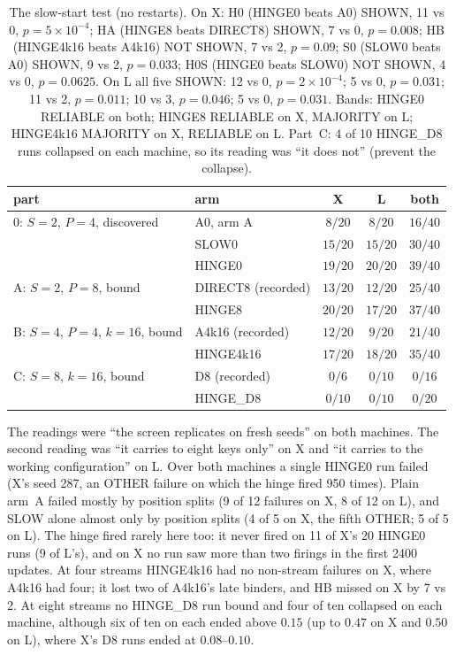 \documentclass[11pt]{article}
\newcommand{\arm}[1]{\textsf{#1}}
\begin{document}
\begin{table}[h]
\centering
\small
\begin{tabular}{@{}llccc@{}}
\toprule
part & arm & X & L & both\\
\midrule
0: $S{=}2$, $P{=}4$, discovered & \arm{A0}, arm \arm{A} & $8/20$ & $8/20$ & $16/40$\\
 & \arm{SLOW0} & $15/20$ & $15/20$ & $30/40$\\
 & \arm{HINGE0} & $19/20$ & $20/20$ & $39/40$\\
\midrule
A: $S{=}2$, $P{=}8$, bound & \arm{DIRECT8} (recorded) & $13/20$ & $12/20$ & $25/40$\\
 & \arm{HINGE8} & $20/20$ & $17/20$ & $37/40$\\
\midrule
B: $S{=}4$, $P{=}4$, $k{=}16$, bound & \arm{A4k16} (recorded) & $12/20$ & $9/20$ & $21/40$\\
 & \arm{HINGE4k16} & $17/20$ & $18/20$ & $35/40$\\
\midrule
C: $S{=}8$, $k{=}16$, bound & \arm{D8} (recorded) & $0/6$ & $0/10$ & $0/16$\\
 & \arm{HINGE\_D8} & $0/10$ & $0/10$ & $0/20$\\
\bottomrule
\end{tabular}
\caption{The slow-start test (no restarts). On X: H0 (\arm{HINGE0} beats \arm{A0}) SHOWN, 11 vs 0, $p = 5\times10^{-4}$; HA (\arm{HINGE8} beats \arm{DIRECT8}) SHOWN, 7 vs 0, $p = 0.008$; HB (\arm{HINGE4k16} beats \arm{A4k16}) NOT SHOWN, 7 vs 2, $p = 0.09$; S0 (\arm{SLOW0} beats \arm{A0}) SHOWN, 9 vs 2, $p = 0.033$; H0S (\arm{HINGE0} beats \arm{SLOW0}) NOT SHOWN, 4 vs 0, $p = 0.0625$. On L all five SHOWN: 12 vs 0, $p = 2\times10^{-4}$; 5 vs 0, $p = 0.031$; 11 vs 2, $p = 0.011$; 10 vs 3, $p = 0.046$; 5 vs 0, $p = 0.031$. Bands: \arm{HINGE0} RELIABLE on both; \arm{HINGE8} RELIABLE on X, MAJORITY on L; \arm{HINGE4k16} MAJORITY on X, RELIABLE on L. Part~C: 4 of 10 \arm{HINGE\_D8} runs collapsed on each machine, so its reading was ``it does not'' (prevent the collapse).}
\label{tab:slowstart}
\end{table}

\noindent
The readings were ``the screen replicates on fresh seeds'' on both machines. The second reading was ``it carries to eight keys only'' on X and ``it carries to the working configuration'' on L. Over both machines a single \arm{HINGE0} run failed (X's seed 287, an OTHER failure on which the hinge fired 950 times). Plain arm~\arm{A} failed mostly by position splits (9 of 12 failures on X, 8 of 12 on L), and SLOW alone almost only by position splits (4 of 5 on X, the fifth OTHER; 5 of 5 on L). The hinge fired rarely here too: it never fired on 11 of X's 20 \arm{HINGE0} runs (9 of L's), and on X no run saw more than two firings in the first 2400 updates. At four streams \arm{HINGE4k16} had no non-stream failures on X, where \arm{A4k16} had four; it lost two of \arm{A4k16}'s late binders, and HB missed on X by 7 vs 2. At eight streams no \arm{HINGE\_D8} run bound and four of ten collapsed on each machine, although six of ten on each ended above $0.15$ (up to $0.47$ on X and $0.50$ on L), where X's \arm{D8} runs ended at $0.08$--$0.10$.
\end{document}
